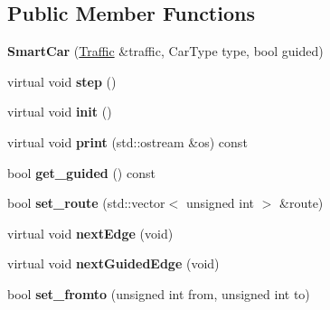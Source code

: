 \subsection*{Public Member Functions}
\begin{DoxyCompactItemize}
\item 
\hypertarget{classjustine_1_1robocar_1_1SmartCar_af379e86c39a7f9ebc3642123782b4daa}{{\bfseries Smart\-Car} (\hyperlink{classjustine_1_1robocar_1_1Traffic}{Traffic} \&traffic, Car\-Type type, bool guided)}\label{classjustine_1_1robocar_1_1SmartCar_af379e86c39a7f9ebc3642123782b4daa}

\item 
\hypertarget{classjustine_1_1robocar_1_1SmartCar_a8702e16ac4bab30c1871997c934504b0}{virtual void {\bfseries step} ()}\label{classjustine_1_1robocar_1_1SmartCar_a8702e16ac4bab30c1871997c934504b0}

\item 
\hypertarget{classjustine_1_1robocar_1_1SmartCar_a507b7ccf9f989e3785a9a11828d49856}{virtual void {\bfseries init} ()}\label{classjustine_1_1robocar_1_1SmartCar_a507b7ccf9f989e3785a9a11828d49856}

\item 
\hypertarget{classjustine_1_1robocar_1_1SmartCar_a6d567bd88522d9bd592a8ad91b3e146e}{virtual void {\bfseries print} (std\-::ostream \&os) const }\label{classjustine_1_1robocar_1_1SmartCar_a6d567bd88522d9bd592a8ad91b3e146e}

\item 
\hypertarget{classjustine_1_1robocar_1_1SmartCar_a3b94461947ba83705444017958ef3cb3}{bool {\bfseries get\-\_\-guided} () const }\label{classjustine_1_1robocar_1_1SmartCar_a3b94461947ba83705444017958ef3cb3}

\item 
\hypertarget{classjustine_1_1robocar_1_1SmartCar_a2c1607a4bfe45e29f8a631b35e2f9a98}{bool {\bfseries set\-\_\-route} (std\-::vector$<$ unsigned int $>$ \&route)}\label{classjustine_1_1robocar_1_1SmartCar_a2c1607a4bfe45e29f8a631b35e2f9a98}

\item 
\hypertarget{classjustine_1_1robocar_1_1SmartCar_a8830e8b23885d3fb5039b7517cfa84dc}{virtual void {\bfseries next\-Edge} (void)}\label{classjustine_1_1robocar_1_1SmartCar_a8830e8b23885d3fb5039b7517cfa84dc}

\item 
\hypertarget{classjustine_1_1robocar_1_1SmartCar_a40947f44df0dcee308a6db4912d40646}{virtual void {\bfseries next\-Guided\-Edge} (void)}\label{classjustine_1_1robocar_1_1SmartCar_a40947f44df0dcee308a6db4912d40646}

\item 
\hypertarget{classjustine_1_1robocar_1_1SmartCar_a081cc666a87c18f0b7471f19c0afcdb0}{bool {\bfseries set\-\_\-fromto} (unsigned int from, unsigned int to)}\label{classjustine_1_1robocar_1_1SmartCar_a081cc666a87c18f0b7471f19c0afcdb0}

\end{DoxyCompactItemize}
